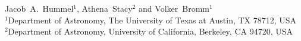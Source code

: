 Jacob~A.~Hummel$^{1}$, Athena~Stacy$^{2}$ and Volker~Bromm$^{1}$\\
$^1$Department of Astronomy, The University of Texas at Austin, TX 78712, USA\\
$^2$Department of Astronomy, University of California, Berkeley, CA 94720, USA